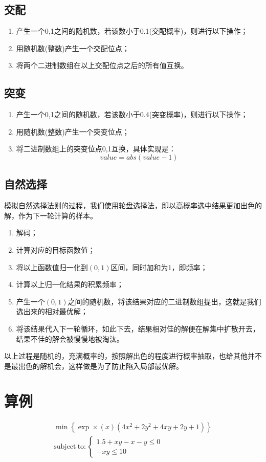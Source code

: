 \documentclass[12pt]{article}
\begin{document}
\subsection{交配}
\begin{enumerate}
\item 产生一个0,1之间的随机数，若该数小于0.1(交配概率)，则进行以下操作；
\item 用随机数(整数)产生一个交配位点；
\item 将两个二进制数组在以上交配位点之后的所有值互换。
\end{enumerate}
\subsection{突变}
\begin{enumerate}
\item 产生一个0,1之间的随机数，若该数小于0.4(突变概率)，则进行以下操作；
\item 用随机数(整数)产生一个突变位点；
\item 将二进制数组上的突变位点0,1互换，具体实现是：
\begin{equation}
value = abs\left(value-1\right)
\end{equation}
\end{enumerate}
\subsection{自然选择}
模拟自然选择法则的过程，我们使用轮盘选择法，即以高概率选中结果更加出色的解，作为下一轮计算的样本。
\begin{enumerate}
\item 解码；
\item 计算对应的目标函数值；
\item 将以上函数值归一化到$\left(0,1\right)$区间，同时加和为1，即频率；
\item 计算以上归一化结果的积累频率；
\item 产生一个$\left(0,1\right)$之间的随机数，将该结果对应的二进制数组提出，这就是我们选出来的相对最优解；
\item 将该结果代入下一轮循环，如此下去，结果相对佳的解便在解集中扩散开去，结果不佳的解会被慢慢地被淘汰。
\end{enumerate}\par
以上过程是随机的，充满概率的，按照解出色的程度进行概率抽取，也给其他并不是最出色的解机会，这样做是为了防止陷入局部最优解。
\section{算例}
\begin{equation}\label{eqn:dec}
\begin{array}{l}
\min \left\{ {\exp \times \left( x \right)\left( {4{x^2} + 2{y^2} + 4xy + 2y + 1} \right)} \right\}\\
\mathrm{subject~to:}\left\{ \begin{array}{l}
1.5 + xy - x - y \le 0\\
 - xy \le 10
\end{array} \right.
\end{array}
\end{equation}
\end{document}
